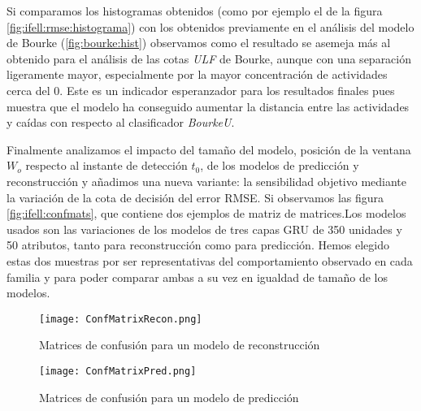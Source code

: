 

Si comparamos los histogramas obtenidos (como por ejemplo el de la figura \ref{fig:ifell:rmse:histograma}) con los obtenidos previamente en el análisis del modelo de Bourke (\ref{fig:bourke:hist}) observamos como el resultado se asemeja más al obtenido para el análisis de las cotas \textit{ULF} de Bourke, aunque con una separación ligeramente mayor, especialmente por la mayor concentración de actividades cerca del 0. Este es un indicador esperanzador para los resultados finales pues muestra que el modelo ha conseguido aumentar la distancia entre las actividades y caídas con respecto al clasificador \textit{BourkeU}.

Finalmente analizamos el impacto del tamaño del modelo, posición de la ventana $W_o$ respecto al instante de detección $t_0$, de los modelos de predicción y reconstrucción y añadimos una nueva variante: la sensibilidad objetivo mediante la variación de la cota de decisión del error RMSE. Si observamos las figura \ref{fig:ifell:confmats}, que contiene dos ejemplos de matriz de matrices.Los modelos usados son las variaciones de los modelos de tres capas GRU de 350 unidades y 50 atributos, tanto para reconstrucción como para predicción. Hemos elegido estas dos muestras por ser representativas del comportamiento observado en cada familia y para poder comparar ambas a su vez en igualdad de tamaño de los modelos.


\begin{sidewaysfigure}[!ht]
  \centering
  \begin{subfigure}[b]{0.45\textwidth}
      \centering
      \texttt{[image: ConfMatrixRecon.png]}
      \caption{\footnotesize \label{fig:ifell:confmat:recon}Matrices de confusión para un modelo de reconstrucción}
  \end{subfigure}
  \hfill
  \begin{subfigure}[b]{0.45\textwidth}
      \centering
      \texttt{[image: ConfMatrixPred.png]}
      \caption{\footnotesize \label{fig:ifell:confmat:pred}Matrices de confusión para un modelo de predicción}
  \end{subfigure}
  \caption{\label{fig:ifell:confmats}Ejemplos de matrices de confusión según sensibilidad deseada y posición de la ventana}
\end{sidewaysfigure}

